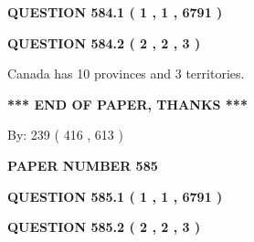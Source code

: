 \documentclass[12pt]{article}
\begin{document}
   
  
\vspace{0.2in}
  
{\textbf{\Large{QUESTION
584.1 
 ( 1 , 1 , 6791 )
}}}
  
  
  
\vspace{0.2in}
  
{\textbf{\Large{QUESTION
584.2 
 ( 2 , 2 , 3 )
}}}
  
  
 
 
\noindent{}
 
 
Canada has 10  provinces and 3 territories.
 
 
 
 
   
   
 \vspace{0.2in}
 
   
   
   
   
\vspace{1.0in} 
{\textbf{\large{ *** END OF PAPER, THANKS *** }}} 
   
   
\hspace{1.0in} By: 
 239 ( 416 ,  613 )
   
   
   
   
\newpage 
\setcounter{page}{ 
   585001 } 
   
   
   
   
 {\textbf{ \Large{ PAPER NUMBER  585  }}}
   
   
\vspace{0.2in}
   
   
   
   
   
   
 \vspace{0.2in}
 
 
 
 
   
   
  
\vspace{0.2in}
  
{\textbf{\Large{QUESTION
585.1 
 ( 1 , 1 , 6791 )
}}}
  
  
  
\vspace{0.2in}
  
{\textbf{\Large{QUESTION
585.2 
 ( 2 , 2 , 3 )
}}}
  
\end{document}
